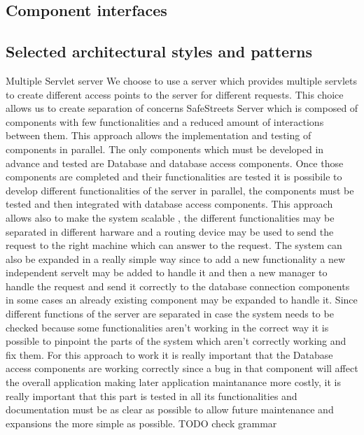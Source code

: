 \subsection{Component interfaces}

\subsection{Selected architectural styles and patterns}
Multiple Servlet server
\newline
We choose to use a server which provides multiple servlets to create different access points to the server for different requests. This choice allows us to create separation of concerns SafeStreets Server which is composed of components with few functionalities and a reduced amount of interactions between them. This approach allows the implementation and testing of components in parallel. The only components which must be developed in advance and tested are Database and database access components. Once those components  are completed  and their functionalities are tested it is possibile to develop different functionalities of the server in parallel, the components must be tested and then integrated with database access components. This approach allows also to make the system scalable , the different functionalities may be separated in different harware and a routing device may be used to send the request to the right machine which can answer to the request. The system can also be expanded in a really simple way since to add a new functionality a new independent servelt may be added to handle it and then a new manager to handle the request and send it correctly to the database connection components in some cases an  already existing component may be expanded to handle it.
Since different functions of the server are separated in case the system needs to be checked because some functionalities aren't working in the correct way it is possible to pinpoint the parts of the system which aren't correctly working and fix them. For this approach to work it is really important that the Database access components are working correctly since a bug in that component will affect the overall application making later application maintanance more costly, it is really important that this part is tested in all its functionalities and documentation must be as clear as possible to allow future maintenance and expansions the more simple as possible.
TODO check grammar

